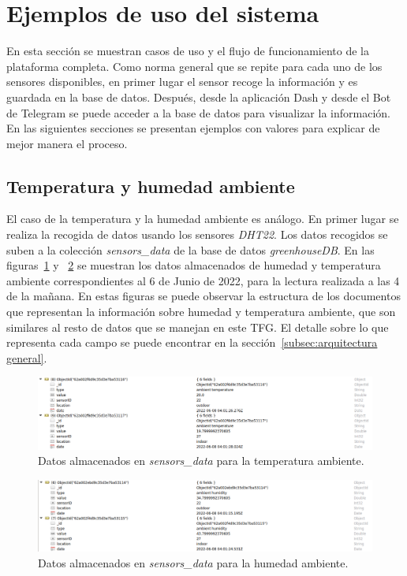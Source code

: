 \documentclass[a4paper, 12pt, oneside]{book}
\begin{document}
\section{Ejemplos de uso del sistema}
\label{sec:aplicación de dash ejemplos}
En esta sección se muestran casos de uso y el flujo de funcionamiento de la plataforma completa.
Como norma general que se repite para cada uno de los sensores disponibles, en primer lugar el sensor recoge la información y es guardada en la base de datos. Después, desde la aplicación Dash y desde el Bot de Telegram se puede acceder a la base de datos para visualizar la información. En las siguientes secciones se presentan ejemplos con valores para explicar de mejor manera el proceso.

\subsection{Temperatura y humedad ambiente}
\label{subsec: temperatura y humedad ambiente}
El caso de la temperatura y la humedad ambiente es análogo. En primer lugar se realiza la recogida de datos usando los sensores \textit{DHT22}. Los datos recogidos se suben a la colección \textit{sensors\_data} de la base de datos \textit{greenhouseDB}. En las figuras~\ref{figura:robo3t_ambient_temperature} y ~\ref{figura:robo3t_ambient_humidity} se muestran los datos almacenados de humedad y temperatura ambiente correspondientes al 6 de Junio de 2022, para la lectura realizada a las 4 de la mañana. En estas figuras se puede observar la estructura de los documentos que representan la información sobre humedad y temperatura ambiente, que son similares al resto de datos que se manejan en este TFG. El detalle sobre lo que representa cada campo se puede encontrar en la sección~\ref{subsec:arquitectura general}.

\begin{figure}[H]
	\centering
    \includegraphics[width=12cm, keepaspectratio]{img/robo3t_ambient_temperature}
    \caption{Datos almacenados en \textit{sensors\_data} para la temperatura ambiente.}
    \label{figura:robo3t_ambient_temperature}
\end{figure}
\begin{figure}[H]
	\centering
    \includegraphics[width=12cm, keepaspectratio]{img/robo3t_ambient_humidity}
    \caption{Datos almacenados en \textit{sensors\_data} para la humedad ambiente.}
    \label{figura:robo3t_ambient_humidity}
\end{figure} 
\end{document}
